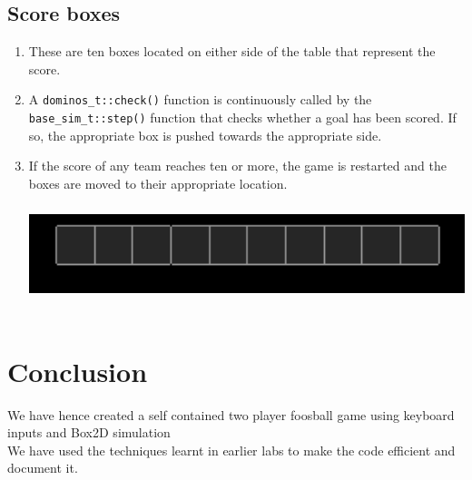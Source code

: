 \documentclass{article}
\begin{document}
\subsection{Score boxes}
\begin{enumerate}
\item These are ten boxes located on either side of the table that represent the score.
\item A \texttt{dominos\_t::check()} function is continuously called by the \texttt{base\_sim\_t::step()} function that checks whether a goal has been scored. If so, the appropriate box is pushed towards the appropriate side.
\item If the score of any team reaches ten or more, the game is restarted and the boxes are moved to their appropriate location.\\
\includegraphics[width=400pt,height=100pt]{Scores}
\end{enumerate}

\section{Conclusion}
We have hence created a self contained two player foosball game using keyboard inputs and Box2D simulation\\
We have used the techniques learnt in earlier labs to make the code efficient and document it. \\


\end{document}
